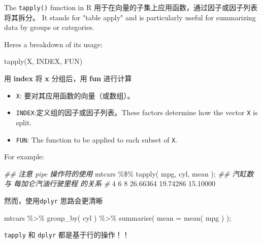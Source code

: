\documentclass[
]{article}
\newenvironment{Shaded}{}{}
\newcommand{\AttributeTok}[1]{\textcolor[rgb]{0.49,0.56,0.16}{#1}}
\newcommand{\CommentTok}[1]{\textcolor[rgb]{0.38,0.63,0.69}{\textit{#1}}}
\newcommand{\DecValTok}[1]{\textcolor[rgb]{0.25,0.63,0.44}{#1}}
\newcommand{\DocumentationTok}[1]{\textcolor[rgb]{0.73,0.13,0.13}{\textit{#1}}}
\newcommand{\FloatTok}[1]{\textcolor[rgb]{0.25,0.63,0.44}{#1}}
\newcommand{\FunctionTok}[1]{\textcolor[rgb]{0.02,0.16,0.49}{#1}}
\newcommand{\NormalTok}[1]{#1}
\newcommand{\SpecialCharTok}[1]{\textcolor[rgb]{0.25,0.44,0.63}{#1}}
\begin{document}
The \texttt{tapply()} function in R
用于在向量的子集上应用函数，通过因子或因子列表将其拆分。 It stands for
"table apply" and is particularly useful for summarizing data by groups
or categories.

Here\textquotesingle s a breakdown of its usage:

\begin{Shaded}
\begin{Highlighting}[]
\FunctionTok{tapply}\NormalTok{(X, INDEX, FUN)}
\end{Highlighting}
\end{Shaded}

用 \textbf{index} 将 \textbf{x} 分组后，用 \textbf{fun} 进行计算

\begin{itemize}
\item
  \texttt{X}: 要对其应用函数的向量（或数组）。
\item
  \texttt{INDEX}:定义组的因子或因子列表。These factors determine how the
  vector \texttt{X} is split.
\item
  \texttt{FUN}: The function to be applied to each subset of \texttt{X}.
\end{itemize}

For example:

\begin{Shaded}
\begin{Highlighting}[]
\DocumentationTok{\#\# 注意 pipe 操作符的使用}
\NormalTok{mtcars }\SpecialCharTok{\%\$\%} \FunctionTok{tapply}\NormalTok{( mpg, cyl, mean ); }\DocumentationTok{\#\# 汽缸数 与 每加仑汽油行驶里程 的关系}
\CommentTok{\#}
       \DecValTok{4}        \DecValTok{6}        \DecValTok{8} 
\FloatTok{26.66364} \FloatTok{19.74286} \FloatTok{15.10000} 
\end{Highlighting}
\end{Shaded}

然而，使用\texttt{dplyr} 思路会更清晰

\begin{Shaded}
\begin{Highlighting}[]
\NormalTok{mtcars }\SpecialCharTok{\%\textgreater{}\%} \FunctionTok{group\_by}\NormalTok{( cyl ) }\SpecialCharTok{\%\textgreater{}\%} \FunctionTok{summarise}\NormalTok{( }\AttributeTok{mean =} \FunctionTok{mean}\NormalTok{( mpg ) );}
\end{Highlighting}
\end{Shaded}

\texttt{tapply} 和 \texttt{dplyr} 都是基于行的操作！！
\end{document}
